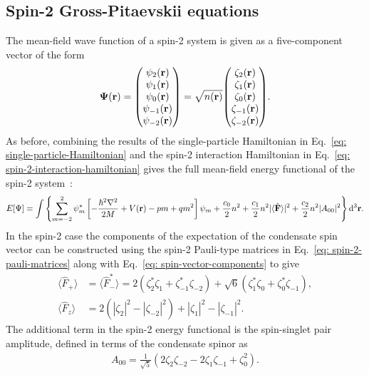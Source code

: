 \subsection{Spin-2 Gross-Pitaevskii equations}
The mean-field wave function of a spin-2 system is given as a five-component
vector of the form
\begin{align}
    \vb{\Psi}(\vb{r}) = \mqty(\psi_2(\vb{r}) \\ \psi_1(\vb{r}) \\
    \psi_0(\vb{r}) \\ \psi_{-1}(\vb{r}) \\ \psi_{-2}(\vb{r})) =
    \sqrt{n(\vb{r})}\mqty(\zeta_2(\vb{r}) \\ \zeta_1(\vb{r}) \\
    \zeta_0(\vb{r}) \\ \zeta_{-1}(\vb{r}) \\ \zeta_{-2}(\vb{r})).
\end{align}
As before, combining the results of the single-particle Hamiltonian in
Eq.~\eqref{eq: single-particle-Hamiltonian} and the spin-2 interaction
Hamiltonian in Eq.~\eqref{eq: spin-2-interaction-hamiltonian} gives the
full mean-field energy functional of the spin-2 system~\cite{Kawaguchi2012}:
\begin{equation}\label{eq: spin-2-energy-functional}
    E[\Psi] = \int \left\{\sum_{m=-2}^{2}\psi_m^*
    \left[-\frac{\hbar^2\nabla^2}{2M} + V(\vb{r}) -pm + qm^2\right]\psi_m
    + \frac{c_0}{2}n^2 + \frac{c_1}{2}n^2|\langle \hat{\vb{F}} \rangle |^2
    + \frac{c_2}{2}n^2|A_{00}|^2\right\} \dd^3\vb{r}.
\end{equation}
In the spin-2 case the components of the expectation of the condensate spin
vector can be constructed using the spin-2 Pauli-type matrices in
Eq.~\eqref{eq: spin-2-pauli-matrices} along with
Eq.~\eqref{eq: spin-vector-components} to give
\begin{align}\label{eq: spin-2-spin-vectors}
    \langle\hat{F}_+\rangle &= \langle\hat{F}_-^*\rangle =
    2\left(\zeta^*_2\zeta_1 + \zeta_{-1}^*\zeta_{-2}\right)
    + \sqrt{6}\left(\zeta_1^*\zeta_0 + \zeta_0^*\zeta_{-1}\right), \\
    \langle\hat{F}_z\rangle &= 2\left(|\zeta_2|^2-|\zeta_{-2}|^2\right)
    + |\zeta_1|^2 - |\zeta_{-1}|^2.
\end{align}
The additional term in the spin-2 energy functional is the spin-singlet pair
amplitude, defined in terms of the condensate spinor as
\begin{align}\label{eq: spin-singlet-duo}
    A_{00} = \frac{1}{\sqrt{5}}\left(2\zeta_2\zeta_{-2} - 2\zeta_1\zeta_{-1}
        + \zeta_0^2\right).
\end{align}

